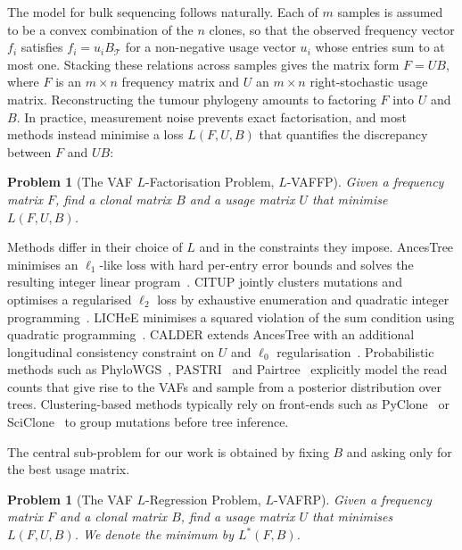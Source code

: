 \documentclass[11pt]{article}
\newtheorem{problem}[theorem]{Problem}
\begin{document}
The model for bulk sequencing follows naturally. Each of $m$ samples is assumed to be a convex combination of the $n$ clones, so that the observed frequency vector $f_i$ satisfies $f_i = u_i B_{\mathcal{T}}$ for a non-negative usage vector $u_i$ whose entries sum to at most one. Stacking these relations across samples gives the matrix form $F = U B$, where $F$ is an $m\times n$ frequency matrix and $U$ an $m\times n$ right-stochastic usage matrix. Reconstructing the tumour phylogeny amounts to factoring $F$ into $U$ and $B$. In practice, measurement noise prevents exact factorisation, and most methods instead minimise a loss $L(F, U, B)$ that quantifies the discrepancy between $F$ and $UB$:

\begin{problem}[The VAF $L$-Factorisation Problem, $L$-VAFFP]
Given a frequency matrix $F$, find a clonal matrix $B$ and a usage matrix $U$ that minimise $L(F, U, B)$.
\end{problem}

Methods differ in their choice of $L$ and in the constraints they impose. AncesTree minimises an $\ell_1$-like loss with hard per-entry error bounds and solves the resulting integer linear program~\citep{elkebir2015reconstruction}. CITUP jointly clusters mutations and optimises a regularised $\ell_2$ loss by exhaustive enumeration and quadratic integer programming~\citep{malikic2015citup}. LICHeE minimises a squared violation of the sum condition using quadratic programming~\citep{popic2015lichee}. CALDER extends AncesTree with an additional longitudinal consistency constraint on $U$ and $\ell_0$ regularisation~\citep{myers2019calder}. Probabilistic methods such as PhyloWGS~\citep{deshwar2015phylowgs}, PASTRI~\citep{satas2017pastri} and Pairtree~\citep{wintersinger2022pairtree} explicitly model the read counts that give rise to the VAFs and sample from a posterior distribution over trees. Clustering-based methods typically rely on front-ends such as PyClone~\citep{roth2014pyclone} or SciClone~\citep{miller2014sciclone} to group mutations before tree inference.

The central sub-problem for our work is obtained by fixing $B$ and asking only for the best usage matrix.

\begin{problem}[The VAF $L$-Regression Problem, $L$-VAFRP]
Given a frequency matrix $F$ and a clonal matrix $B$, find a usage matrix $U$ that minimises $L(F, U, B)$. We denote the minimum by $L^*(F, B)$.
\end{problem}
\end{document}
